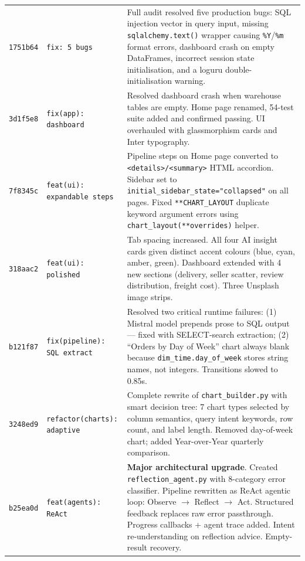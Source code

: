 \documentclass[12pt,a4paper]{report}
\begin{document}
\begin{longtable}{lp{2.8cm}p{8cm}}
  \texttt{1751b64} &
  \texttt{fix: 5 bugs} &
  Full audit resolved five production bugs: SQL injection vector in query input, missing
  \texttt{sqlalchemy.text()} wrapper causing \texttt{\%Y}/\texttt{\%m} format errors, dashboard
  crash on empty DataFrames, incorrect session state initialisation, and a loguru
  double-initialisation warning. \\[4pt]

  \texttt{3d1f5e8} &
  \texttt{fix(app): dashboard} &
  Resolved dashboard crash when warehouse tables are empty. Home page renamed, 54-test suite
  added and confirmed passing. UI overhauled with glassmorphism cards and Inter typography. \\[4pt]

  \texttt{7f8345c} &
  \texttt{feat(ui): expandable steps} &
  Pipeline steps on Home page converted to \texttt{<details>/<summary>} HTML accordion.
  Sidebar set to \texttt{initial\_sidebar\_state="collapsed"} on all pages. Fixed
  \texttt{**CHART\_LAYOUT} duplicate keyword argument errors using \texttt{chart\_layout(**overrides)}
  helper. \\[4pt]

  \texttt{318aac2} &
  \texttt{feat(ui): polished} &
  Tab spacing increased. All four AI insight cards given distinct accent colours (blue, cyan,
  amber, green). Dashboard extended with 4 new sections (delivery, seller scatter, review
  distribution, freight cost). Three Unsplash image strips. \\[4pt]

  \texttt{b121f87} &
  \texttt{fix(pipeline): SQL extract} &
  Resolved two critical runtime failures: (1) Mistral model prepends prose to SQL output —
  fixed with SELECT-search extraction; (2) ``Orders by Day of Week'' chart always blank because
  \texttt{dim\_time.day\_of\_week} stores string names, not integers. Transitions slowed to 0.85s. \\[4pt]

  \texttt{3248ed9} &
  \texttt{refactor(charts): adaptive} &
  Complete rewrite of \texttt{chart\_builder.py} with smart decision tree: 7 chart types
  selected by column semantics, query intent keywords, row count, and label length. Removed
  day-of-week chart; added Year-over-Year quarterly comparison. \\[4pt]

  \texttt{b25ea0d} &
  \texttt{feat(agents): ReAct} &
  \textbf{Major architectural upgrade}. Created \texttt{reflection\_agent.py} with 8-category
  error classifier. Pipeline rewritten as ReAct agentic loop: Observe $\to$ Reflect $\to$ Act.
  Structured feedback replaces raw error passthrough. Progress callbacks + agent trace added.
  Intent re-understanding on reflection advice. Empty-result recovery. \\[4pt]


\end{longtable}
\end{document}
